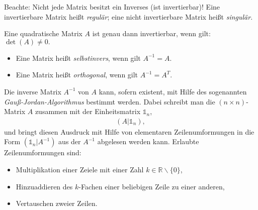 Beachte: Nicht jede Matrix besitzt ein Inverses (ist invertierbar)! Eine invertierbare Matrix heißt \emph{regulär}; eine nicht invertierbare Matrix heißt \emph{singulär}. 
\begin{satz}
    Eine quadratische Matrix $A$ ist genau dann invertierbar, wenn gilt: $\det(A) \neq 0.$
\end{satz}
\begin{itemize}
    \item Eine Matrix heißt \emph{selbstinvers}, wenn gilt $A^{-1} =A$. 
    \item Eine Matrix heißt \emph{orthogonal}, wenn gilt $A^{-1} = A^T$.
\end{itemize}
Die inverse Matrix $A^{-1}$ von $A$ kann, sofern existent, mit Hilfe des sogenannten \emph{Gauß-Jordan-Algorithmus} bestimmt werden. Dabei schreibt man die $(n\times n)$-Matrix $A$ zusammen mit der Einheitsmatrix $\mathds{1}_n$, 
\begin{align}
    (A | \mathds{1}_n),
\end{align}
und bringt diesen Ausdruck mit Hilfe von elementaren Zeilenumformungen in die Form $(\mathds{1}_n | A^{-1})$ aus der $A^{-1}$ abgelesen werden kann. Erlaubte Zeilenumformungen sind: 
\begin{itemize}
    \item Multiplikation einer Zeiele mit einer Zahl $k \in \mathbb{R}\backslash\{0\}$, 
    \item Hinzuaddieren des $k$-Fachen einer beliebigen Zeile zu einer anderen, 
    \item Vertauschen zweier Zeilen.
\end{itemize}

